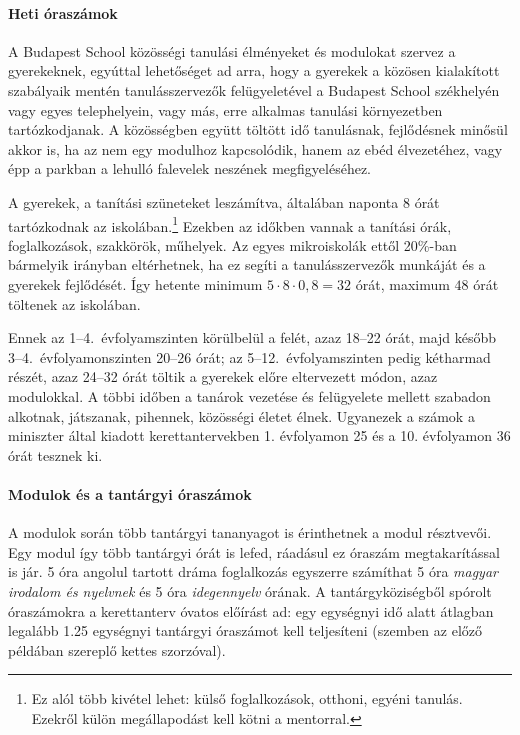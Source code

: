 \paragraph{Heti óraszámok} 
A Budapest School közösségi tanulási élményeket és modulokat szervez a gyerekeknek, egyúttal lehetőséget ad arra, hogy a gyerekek a közösen kialakított szabályaik mentén tanulásszervezők felügyeletével a Budapest School székhelyén vagy egyes telephelyein, vagy más, erre alkalmas tanulási környezetben tartózkodjanak. A közösségben együtt töltött idő tanulásnak, fejlődésnek minősül akkor is, ha az nem egy modulhoz kapcsolódik, hanem az ebéd élvezetéhez, vagy épp a parkban a lehulló falevelek neszének megfigyeléséhez.

A gyerekek, a tanítási szüneteket leszámítva, általában naponta 8 órát tartózkodnak az iskolában.\footnote{Ez alól több kivétel lehet: külső foglalkozások, otthoni, egyéni tanulás. Ezekről külön megállapodást kell kötni a mentorral.} Ezekben az időkben vannak a tanítási órák, foglalkozások, szakkörök, műhelyek. Az egyes mikroiskolák ettől 20\%-ban bármelyik irányban eltérhetnek, ha ez segíti a tanulásszervezők munkáját és a gyerekek fejlődését. Így hetente minimum $5 \cdot 8 \cdot 0,8 = 32$ órát, maximum $48$ órát töltenek az iskolában.

Ennek az 1--4.~évfolyamszinten körülbelül a felét, azaz 18--22 órát, majd később 3--4.~évfolyamonszinten 20--26 órát; az 5--12.~évfolyamszinten pedig kétharmad részét, azaz 24--32 órát töltik a gyerekek előre eltervezett módon, azaz modulokkal. A többi időben a tanárok vezetése és felügyelete mellett szabadon alkotnak, játszanak, pihennek, közösségi életet élnek. Ugyanezek a számok a miniszter által kiadott kerettantervekben 1. évfolyamon 25 és a 10. évfolyamon 36 órát tesznek ki.

\paragraph{Modulok és a tantárgyi óraszámok}
A modulok során több tantárgyi tananyagot is érinthetnek a modul résztvevői. Egy modul így több tantárgyi órát is lefed, ráadásul ez óraszám megtakarítással is jár. 5 óra angolul tartott dráma foglalkozás egyszerre számíthat 5 óra \emph{magyar irodalom és nyelvnek} és 5 óra \emph{idegennyelv} órának. A tantárgyköziségből spórolt óraszámokra a kerettanterv óvatos előírást ad: egy egységnyi idő alatt átlagban legalább 1.25 egységnyi tantárgyi óraszámot kell teljesíteni (szemben az előző példában szereplő kettes szorzóval).


